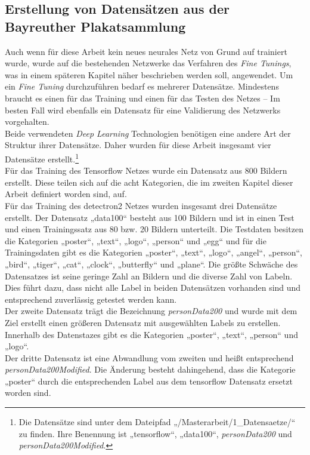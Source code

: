 \documentclass[a4paper,12pt,ngerman]{article}
\begin{document}
\subsection{Erstellung von Datensätzen aus der Bayreuther Plakatsammlung}
Auch wenn für diese Arbeit kein neues neurales Netz von Grund auf trainiert wurde, wurde auf die bestehenden Netzwerke das Verfahren des \textit{Fine Tunings}, was in einem späteren Kapitel näher beschrieben werden soll, angewendet. Um ein \textit{Fine Tuning} durchzuführen bedarf es mehrerer Datensätze. Mindestens braucht es einen für das Training und einen für das Testen des Netzes – Im besten Fall wird ebenfalls ein Datensatz für eine Validierung des Netzwerks vorgehalten. \\
Beide verwendeten \textit{Deep Learning} Technologien benötigen eine andere Art der Struktur ihrer Datensätze. Daher wurden für diese Arbeit insgesamt vier Datensätze erstellt.\footnote{Die Datensätze sind unter dem Dateipfad „/Masterarbeit/1\_Datensaetze/“ zu finden. Ihre Benennung ist „tensorflow“, „data100“, \textit{personData200} und \textit{personData200Modified}.} \\
Für das Training des Tensorflow Netzes wurde ein Datensatz aus 800 Bildern erstellt. Diese teilen sich auf die acht Kategorien, die im zweiten Kapitel dieser Arbeit definiert worden sind, auf. \\
Für das Training des detectron2 Netzes wurden insgesamt drei Datensätze erstellt. Der Datensatz „data100“ besteht aus 100 Bildern und ist in einen Test und einen Trainingssatz aus 80 bzw. 20 Bildern unterteilt. Die Testdaten besitzen die Kategorien „poster“, „text“, „logo“, „person“ und „egg“ und für die Trainingsdaten gibt es die Kategorien „poster“, „text“, „logo“, „angel“, „person“, „bird“, „tiger“, „cat“, „clock“, „butterfly“ und „plane“. Die größte Schwäche des Datensatzes ist seine geringe Zahl an Bildern und die diverse Zahl von Labeln. Dies führt dazu, dass nicht alle Label in beiden Datensätzen vorhanden sind und entsprechend zuverlässig getestet werden kann. \\
Der zweite Datensatz trägt die Bezeichnung \textit{personData200} und wurde mit dem Ziel erstellt einen größeren Datensatz mit ausgewählten Labels zu erstellen. Innerhalb des Datenstazes gibt es die Kategorien „poster“, „text“, „person“ und „logo“. \\
Der dritte Datensatz ist eine Abwandlung vom zweiten und heißt entsprechend \textit{personData200Modified}. Die Änderung besteht dahingehend, dass die Kategorie „poster“ durch die entsprechenden Label aus dem tensorflow Datensatz ersetzt worden sind. \\
\end{document}
